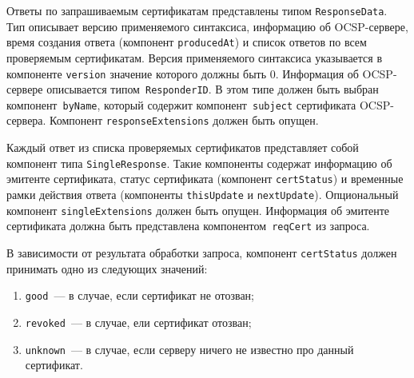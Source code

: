 
Ответы по запрашиваемым сертификатам представлены типом 
\texttt{ResponseData}. Тип описывает версию применяемого синтаксиса, 
информацию об OCSP-сервере, время создания ответа (компонент 
\texttt{producedAt}) и список ответов по всем проверяемым сертификатам. 
Версия применяемого синтаксиса указывается в компоненте
\texttt{version}\addendum{,} значение которого должны быть $0$. 
Информация об OCSP-сервере описывается типом~\texttt{ResponderID}.
В этом типе должен быть выбран компонент~\texttt{byName},
который содержит компонент~\texttt{subject} 
сертификата OCSP-сервера. Компонент \texttt{responseExtensions} должен быть опущен.


Каждый ответ из списка проверяемых сертификатов представляет собой
компонент типа \texttt{SingleResponse}. Такие компоненты содержат
информацию об эмитенте сертификата, статус сертификата (компонент
\texttt{certStatus}) и временные рамки действия ответа (компоненты
\texttt{thisUpdate} и \texttt{nextUpdate}). Опциональный компонент
\texttt{singleExtensions} должен быть опущен. Информация об эмитенте
сертификата должна быть представлена компонентом~\texttt{reqCert} из
запроса.


В зависимости от результата обработки запроса, компонент 
\texttt{certStatus} должен принимать одно из следующих значений: 
\begin{enumerate}
\item \texttt{good}~--- в случае, если сертификат не отозван;
\item \texttt{revoked}~--- в случае, ели сертификат отозван;
\item \texttt{unknown}~--- в случае, если серверу ничего не известно про 
данный сертификат. 
\end{enumerate}
 

